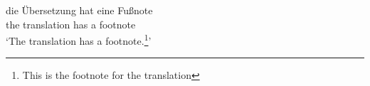 \ea
\gll die {\"U}bersetzung hat eine Fu{\ss}note\\
     the translation has a footnote\\
\glt `The translation has a footnote.\footnote{This is the footnote for the translation}'
\z